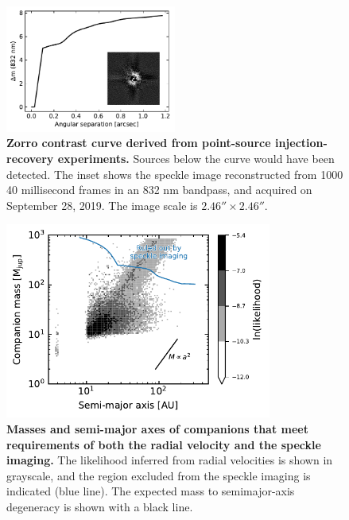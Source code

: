 \documentclass[12pt,twocolumn,tighten]{aastex62}
\begin{document}
\begin{figure}[!t]
	\begin{center}
		\leavevmode
		\includegraphics[width=0.5\textwidth]{f3.pdf}
	\end{center}
	\vspace{-0.7cm}
    \caption{
      {\bf Zorro contrast curve derived from point-source
      injection-recovery experiments.} Sources below the curve would
      have been detected.  The inset shows the speckle image
      reconstructed from 1000 40 millisecond frames in an 832 nm
      bandpass, and acquired on September 28, 2019.  The image scale
      is $2.46''\times2.46''$.
    }
    \label{fig:zorro}
\end{figure}

\begin{figure}[t]
	\begin{center}
		\leavevmode
		\includegraphics[width=0.78\textwidth]{f4.pdf}
	\end{center}
	\vspace{-0.6cm}
	\caption{
    {\bf Masses and semi-major axes of companions that meet
    requirements of both the radial velocity and the speckle imaging.}
    The likelihood inferred from radial velocities is shown in
    grayscale, and the region excluded from the speckle imaging is
    indicated (blue line).  The expected mass to semimajor-axis
    degeneracy is shown with a black line.
	\label{fig:mass_sma}
  \vspace{-0cm}
	}
\end{figure}
\end{document}
